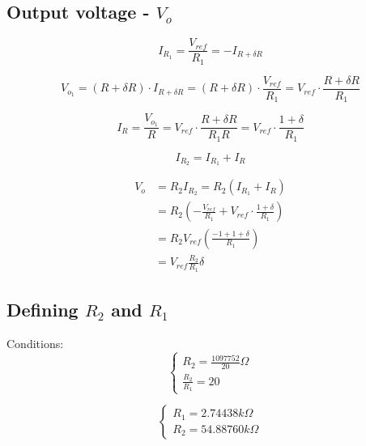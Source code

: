 \documentclass[10pt,a4paper]{article}
\begin{document}
\subsection{Output voltage - $V_o$}

\begin{equation} \label{I_R1}
  I_{R_1} = \frac{V_{ref}}{R_1} = - I_{R+\delta R}
\end{equation}

\begin{equation} \label{V_o1}
  V_{o_1} = (R+\delta R) \cdot I_{R+\delta R}
  = (R+\delta R) \cdot \frac{V_{ref}}{R_1}
  = V_{ref} \cdot \frac{R+\delta R}{R_1}
\end{equation}

\begin{equation} \label{I_R}
  I_R = \frac{V_{o_1}}{R} = V_{ref} \cdot \frac{R+\delta R}{R_1R}
  = V_{ref} \cdot \frac{1+\delta}{R_1}
\end{equation}

\begin{equation} \label{I_R2}
  I_{R_2} = I_{R_1} + I_R
\end{equation}

\begin{align}
  V_o &= R_2 I_{R_2} = R_2 (I_{R_1} + I_R) \nonumber \\
  &= R_2 \left(- \frac{V_{ref}}{R_1} + V_{ref} \cdot \frac{1+\delta}{R_1} \right) \nonumber \\ 
  &= R_2 V_{ref} \left( \frac{-1+1+\delta}{R_1} \right) \nonumber \\
  &= V_{ref}\frac{R_2}{R_1}\delta \label{V_o}
\end{align}

\subsection{Defining $R_2$ and $R_1$}
Conditions:
\begin{equation} \label{eq:conditions3}
  \left\{
    \begin{array}{l}
      R_2 = \frac{1097752}{20}\Omega \\
      \frac{R_2}{R_1} = 20
    \end{array}
  \right.
\end{equation}

\begin{equation} \label{eq:R2R1_3}
  \left\{
    \begin{array}{l}
      R_1 = 2.74438k\Omega \\
      R_2 = 54.88760k\Omega
    \end{array}
  \right.
\end{equation}
\end{document}
